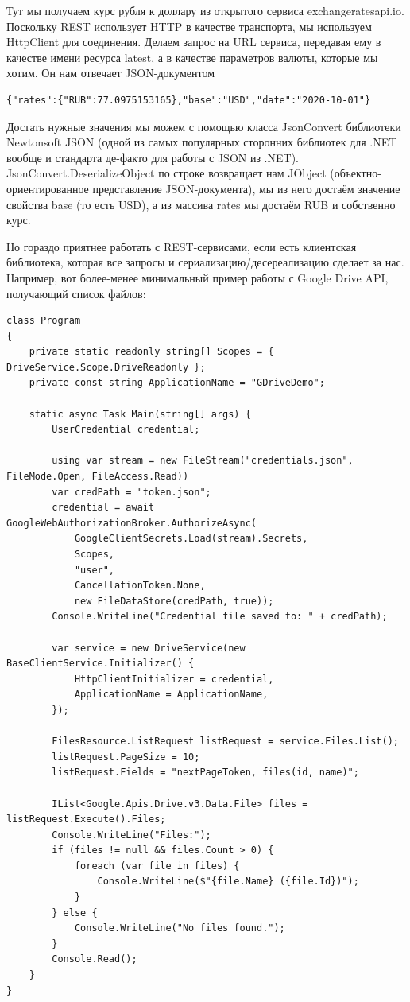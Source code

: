 \documentclass[a5paper]{article}
\begin{document}
Тут мы получаем курс рубля к доллару из открытого сервиса exchangeratesapi.io. Поскольку REST использует HTTP в качестве транспорта, мы используем HttpClient для соединения. Делаем запрос на URL сервиса, передавая ему в качестве имени ресурса latest, а в качестве параметров валюты, которые мы хотим. Он нам отвечает JSON-документом

\begin{verbatim}
{"rates":{"RUB":77.0975153165},"base":"USD","date":"2020-10-01"}
\end{verbatim}

Достать нужные значения мы можем с помощью класса JsonConvert библиотеки Newtonsoft JSON (одной из самых популярных сторонних библиотек для .NET вообще и стандарта де-факто для работы с JSON из .NET). JsonConvert.DeserializeObject по строке возвращает нам JObject (объектно-ориентированное представление JSON-документа), мы из него достаём значение свойства base (то есть USD), а из массива rates мы достаём RUB и собственно курс.


Но гораздо приятнее работать с REST-сервисами, если есть клиентская библиотека, которая все запросы и сериализацию/десереализацию сделает за нас. Например, вот более-менее минимальный пример работы с Google Drive API, получающий список файлов:

\begin{verbatim}
class Program
{
    private static readonly string[] Scopes = { DriveService.Scope.DriveReadonly };
    private const string ApplicationName = "GDriveDemo";

    static async Task Main(string[] args) {
        UserCredential credential;

        using var stream = new FileStream("credentials.json", FileMode.Open, FileAccess.Read))
        var credPath = "token.json";
        credential = await GoogleWebAuthorizationBroker.AuthorizeAsync(
            GoogleClientSecrets.Load(stream).Secrets,
            Scopes,
            "user",
            CancellationToken.None,
            new FileDataStore(credPath, true));
        Console.WriteLine("Credential file saved to: " + credPath);

        var service = new DriveService(new BaseClientService.Initializer() {
            HttpClientInitializer = credential,
            ApplicationName = ApplicationName,
        });

        FilesResource.ListRequest listRequest = service.Files.List();
        listRequest.PageSize = 10;
        listRequest.Fields = "nextPageToken, files(id, name)";

        IList<Google.Apis.Drive.v3.Data.File> files = listRequest.Execute().Files;
        Console.WriteLine("Files:");
        if (files != null && files.Count > 0) {
            foreach (var file in files) {
                Console.WriteLine($"{file.Name} ({file.Id})");
            }
        } else {
            Console.WriteLine("No files found.");
        }
        Console.Read();
    }
}
\end{verbatim}
\end{document}
